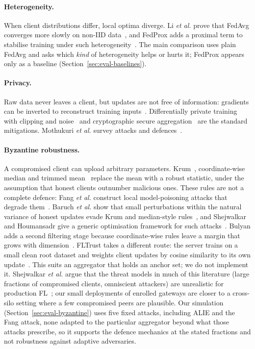 \paragraph{Heterogeneity.}
When client distributions differ, local optima diverge. Li \textit{et al.} prove that FedAvg converges more slowly on non-IID data~\cite{li2020convergence}, and FedProx adds a proximal term to stabilise training under such heterogeneity~\cite{li2020fedprox}. The main comparison uses plain FedAvg and asks which \emph{kind} of heterogeneity helps or hurts it; FedProx appears only as a baseline (Section~\ref{sec:eval-baselines}).

\paragraph{Privacy.}
Raw data never leaves a client, but updates are not free of information: gradients can be inverted to reconstruct training inputs~\cite{zhu2019}. Differentially private training with clipping and noise~\cite{abadi2016} and cryptographic secure aggregation~\cite{bonawitz2017} are the standard mitigations. Mothukuri \textit{et al.} survey attacks and defences~\cite{mothukuri2021}.

\paragraph{Byzantine robustness.}
A compromised client can upload arbitrary parameters. Krum~\cite{blanchard2017}, coordinate-wise median and trimmed mean~\cite{yin2018} replace the mean with a robust statistic, under the assumption that honest clients outnumber malicious ones. These rules are not a complete defence: Fang \textit{et al.} construct local model-poisoning attacks that degrade them~\cite{fang2020}. Baruch \textit{et al.} show that small perturbations within the natural variance of honest updates evade Krum and median-style rules~\cite{baruch2019alie}, and Shejwalkar and Houmansadr give a generic optimisation framework for such attacks~\cite{shejwalkar2021manipulating}. Bulyan adds a second filtering stage because coordinate-wise rules leave a margin that grows with dimension~\cite{elmhamdi2018bulyan}. FLTrust takes a different route: the server trains on a small clean root dataset and weights client updates by cosine similarity to its own update~\cite{cao2021fltrust}. This suits an aggregator that holds an anchor set; we do not implement it. Shejwalkar \textit{et al.} argue that the threat models in much of this literature (large fractions of compromised clients, omniscient attackers) are unrealistic for production FL~\cite{shejwalkar2022drawingboard}; our small deployments of enrolled gateways are closer to a cross-silo setting where a few compromised peers are plausible. Our simulation (Section~\ref{sec:eval-byzantine}) uses five fixed attacks, including ALIE and the Fang attack, none adapted to the particular aggregator beyond what those attacks prescribe, so it supports the defence mechanics at the stated fractions and not robustness against adaptive adversaries.

